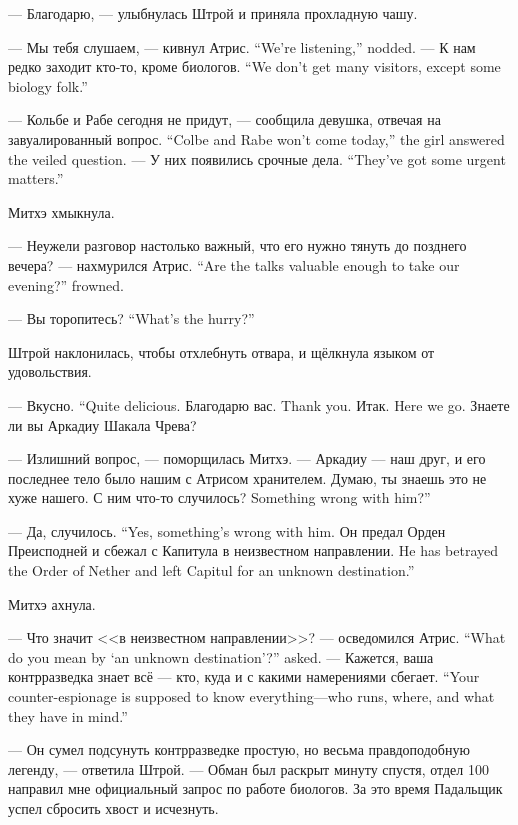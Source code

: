 --- Благодарю, --- улыбнулась Штрой и приняла прохладную чашу.

{--- Мы тебя слушаем, --- кивнул Атрис.}
{``We're listening,'' \Aatris{} nodded.}
{--- К нам редко заходит кто-то, кроме биологов.}
{``We don't get many visitors, except some biology folk.''}

{--- Кольбе и Рабе сегодня не придут, --- сообщила девушка, отвечая на завуалированный вопрос.}
{``Colbe and Rabe won't come today,'' the girl answered the veiled question.}
{--- У них появились срочные дела.}
{``They've got some urgent matters.''}

Митхэ хмыкнула.

{--- Неужели разговор настолько важный, что его нужно тянуть до позднего вечера? --- нахмурился Атрис.}
{``Are the talks valuable enough to take our evening?'' \Aatris{} frowned.}

{--- Вы торопитесь?}
{``What's the hurry?''}

Штрой наклонилась, чтобы отхлебнуть отвара, и щёлкнула языком от удовольствия.

{--- Вкусно.}
{``Quite delicious.}
{Благодарю вас.}
{Thank you.}
{Итак.}
{Here we go.}
Знаете ли вы Аркадиу Шакала Чрева?

--- Излишний вопрос, --- поморщилась Митхэ.
--- Аркадиу --- наш друг, и его последнее тело было нашим с Атрисом хранителем.
Думаю, ты знаешь это не хуже нашего.
{С ним что-то случилось?}
{Something wrong with him?''}

{--- Да, случилось.}
{``Yes, something's wrong with him.}
{Он предал Орден Преисподней и сбежал с Капитула в неизвестном направлении.}
{He has betrayed the Order of Nether and left Capitul for an unknown destination.''}

Митхэ ахнула.

{--- Что значит <<в неизвестном направлении>>? --- осведомился Атрис.}
{``What do you mean by `an unknown destination'?'' \Aatris{} asked.}
{--- Кажется, ваша контрразведка знает всё --- кто, куда и с какими намерениями сбегает.}
{``Your counter-espionage is supposed to know everything---who runs, where, and what they have in mind.''}

--- Он сумел подсунуть контрразведке простую, но весьма правдоподобную легенду, --- ответила Штрой.
--- Обман был раскрыт минуту спустя, отдел 100 направил мне официальный запрос по работе биологов.
За это время Падальщик успел сбросить хвост и исчезнуть.

